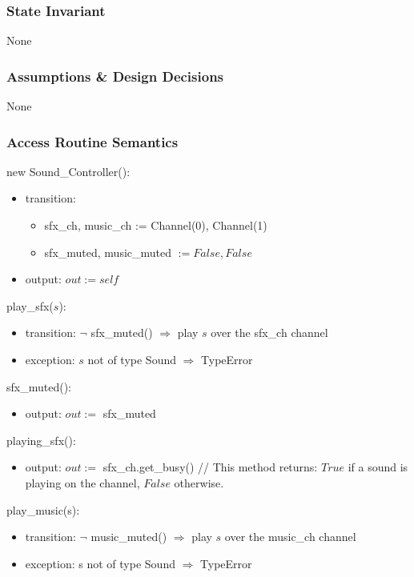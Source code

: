 \documentclass[12pt]{article}
\begin{document}
\subsubsection* {State Invariant}
None

\subsubsection* {Assumptions \& Design Decisions}
None

\subsubsection* {Access Routine Semantics}

new Sound\_Controller():
\begin{itemize}
\item transition:
    \begin{itemize}[]
        \item sfx\_ch, music\_ch := Channel(0), Channel(1)
        \item sfx\_muted, music\_muted $:= False, False$
    \end{itemize}
\item output: $\mathit{out} := \mathit{self}$
\end{itemize}

\noindent play\_sfx($s$):
\begin{itemize}
\item transition: $\lnot$ sfx\_muted() $\Rightarrow$ play $s$ over the sfx\_ch channel
\item exception: $s$ not of type Sound $\Rightarrow$ TypeError
\end{itemize}

\noindent sfx\_muted():
\begin{itemize}
\item output: $out := $ sfx\_muted
\end{itemize}

\noindent playing\_sfx():
\begin{itemize}
\item output: $out := $ sfx\_ch.get\_busy() // This method returns: $True$ if a sound is playing on the channel, $False$ otherwise.
\end{itemize}

\noindent play\_music(s):
\begin{itemize}
\item transition: $\lnot$ music\_muted() $\Rightarrow$ play $s$ over the music\_ch channel
\item exception: s not of type Sound $\Rightarrow$ TypeError
\end{itemize}
\end{document}
